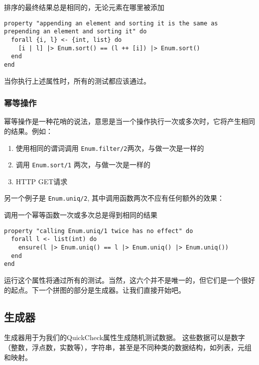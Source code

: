 \begin{code}{排序的最终结果总是相同的，无论元素在哪里被添加}
\begin{verbatim}
property "appending an element and sorting it is the same as prepending an element and sorting it" do
  forall {i, l} <- {int, list} do
    [i | l] |> Enum.sort() == (l ++ [i]) |> Enum.sort()
  end
end
\end{verbatim}
\label{lst:the_final_result_of_sorting_is_always_the_same_no_matter_where_elements_are_added}
\end{code}

当你执行上述属性时，所有的测试都应该通过。

\subsubsection{幂等操作}

幂等操作是一种花哨的说法，意思是当一个操作执行一次或多次时，它将产生相同的结果。例如：
\begin{enumerate}
\item  使用相同的谓词调用 \texttt{Enum.filter/2}两次，与做一次是一样的
\item  调用 \texttt{Enum.sort/1} 两次，与做一次是一样的
\item  HTTP GET请求
\end{enumerate}

另一个例子是 \texttt{Enum.uniq/2}, 其中调用函数两次不应有任何额外的效果：

\begin{code}{调用一个幂等函数一次或多次总是得到相同的结果}
\begin{verbatim}
property "calling Enum.uniq/1 twice has no effect" do
  forall l <- list(int) do
    ensure(l |> Enum.uniq() == l |> Enum.uniq() |> Enum.uniq())
  end
end
\end{verbatim}
\label{lst:calling_an_idempotent_function_once_or_multiple_times_always_yields_the_same_result}
\end{code}

运行这个属性将通过所有的测试。当然，这六个并不是唯一的，但它们是一个很好的起点。下一个拼图的部分是生成器。让我们直接开始吧。

\subsection{生成器}

生成器用于为我们的QuickCheck属性生成随机测试数据。
这些数据可以是数字（整数，浮点数，实数等），字符串，甚至是不同种类的数据结构，如列表，元组和映射。

